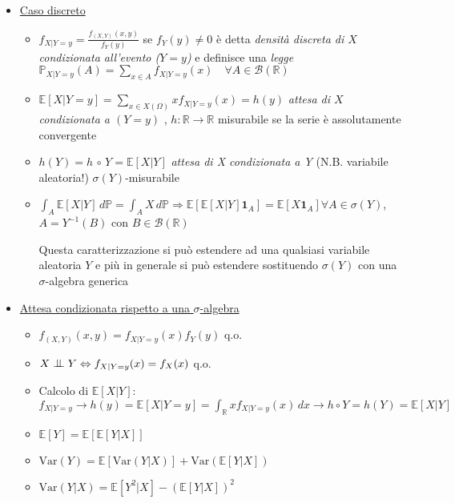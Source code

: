 \documentclass[openany]{book} %
\newcommand{\ind}{\mathrel{\text{\scalebox{1.07}{$\perp\mkern-10mu\perp$}}}}
\begin{document}
\begin{itemize}

\item \underline{Caso discreto}

\begin{itemize}

\item $f_{X|Y=y} = \frac{f_(X,Y)(x,y)}{f_Y(y)}$ se $f_Y(y)\neq 0$ è detta \textit{densità discreta di $X$ condizionata all'evento ($Y=y$)} e definisce una \textit{legge} $\mathbb{P}_{X|Y=y}(A) = \displaystyle\sum_{x\in A}f_{X|Y=y}(x) \quad \forall A\in \mathcal{B}(\mathbb{R})$

\item $\mathbb{E}[X|Y=y] = \displaystyle\sum_{x\in X(\Omega)}xf_{X|Y=y}(x) = h(y)$ \textit{attesa di $X$ condizionata a $(Y=y)$} , $h: \mathbb{R}\rightarrow \mathbb{R}$ misurabile se la serie è assolutamente convergente

\item $h(Y)=h\,\circ\,Y = \mathbb{E}[X|Y]$ \textit{attesa di X condizionata a Y} (N.B. variabile aleatoria!) $\sigma(Y)$-misurabile

\item $\int_A \mathbb{E}[X|Y]\,d \mathbb{P} = \int_AX\,d \mathbb{P}\Rightarrow \mathbb{E}[\mathbb{E}[X|Y]\boldsymbol{1}_A] = \mathbb{E}[X \boldsymbol{1}_A]$\quad$\forall A \in \sigma(Y)$, $A=Y^{-1}(B)$ con $B\in \mathcal{B}(\mathbb{R})$

Questa caratterizzazione si può estendere ad una qualsiasi variabile aleatoria $Y$ e più in generale si può estendere sostituendo $\sigma(Y)$ con una $\sigma$-algebra generica

\end{itemize}

\item \underline{Attesa condizionata rispetto a una $\sigma$-algebra} 

\begin{itemize}

\item $f_{(X,Y)}(x,y) = f_{X|Y=y}(x)f_Y(y)$ q.o.
	
\item $X\ind Y \Leftrightarrow f_{X|Y=y}(x)=f_X(x)$ q.o.

\item Calcolo di $\mathbb{E}[X|Y]$: $f_{X|Y=y}\rightarrow h(y)=\mathbb{E}[X|Y=y] = \int_\mathbb{R}xf_{X|Y=y}(x)\,dx \rightarrow h\circ Y = h(Y)=\mathbb{E}[X|Y]$

\item $\mathbb{E}[Y]=\mathbb{E}[\mathbb{E}[Y|X]]$

\item $\text{Var}(Y)=\mathbb{E}[\text{Var}(Y|X)] + \text{Var}(\mathbb{E}[Y|X])$

\item $\text{Var}(Y|X)=\mathbb{E}[Y^2|X]-(\mathbb{E}[Y|X])^2$

\end{itemize}

\end{itemize}
\end{document}
